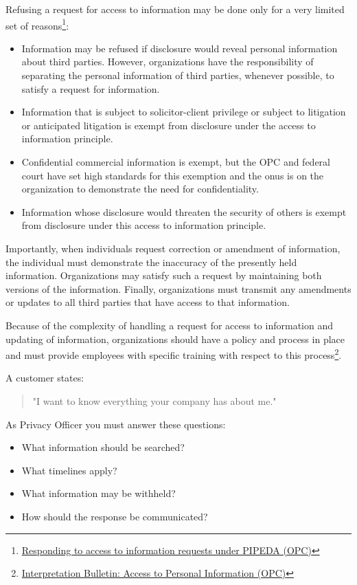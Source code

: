 Refusing a request for access to information may be done only for a very limited set of reasons\footnote{\href{https://www.priv.gc.ca/en/privacy-topics/accessing-personal-information/obligations-for-organizations/02_05_d_54_ati_02/}{Responding to access to information requests under PIPEDA (OPC)}}:

\begin{itemize}
   \item Information may be refused if disclosure would reveal personal information about third parties. However, organizations have the responsibility of separating the personal information of third parties, whenever possible, to satisfy a request for information. 
   \item Information that is subject to solicitor-client privilege or subject to litigation or anticipated litigation is exempt from disclosure under the access to information principle.
   \item Confidential commercial information is exempt, but the OPC and federal court have set high standards for this exemption and the onus is on the organization to demonstrate the need for confidentiality.
   \item Information whose disclosure would threaten the security of others is exempt from disclosure under this access to information principle.
\end{itemize}

Importantly, when individuals request correction or amendment of information, the individual must demonstrate the inaccuracy of the presently held information. Organizations may satisfy such a request by maintaining both versions of the information. Finally, organizations must transmit any amendments or updates to all third parties that have access to that information. 

Because of the complexity of handling a request for access to information and updating of information, organizations should have a policy and process in place and must provide employees with specific training with respect to this process\footnote{\href{https://www.priv.gc.ca/en/privacy-topics/privacy-laws-in-canada/the-personal-information-protection-and-electronic-documents-act-pipeda/pipeda-compliance-help/pipeda-interpretation-bulletins/interpretations_05_access/}{Interpretation Bulletin: Access to Personal Information (OPC)}}. 

\begin{exerciseboxpaper}
A customer states:\\
\begin{quote}
"I want to know everything your company has about me."
\end{quote}
\bigskip
As Privacy Officer you must answer these questions:
\bigskip
\begin{itemize}
    \item What information should be searched?
    \item What timelines apply?
    \item What information may be withheld?
    \item How should the response be communicated?
\end{itemize}
\end{exerciseboxpaper}


